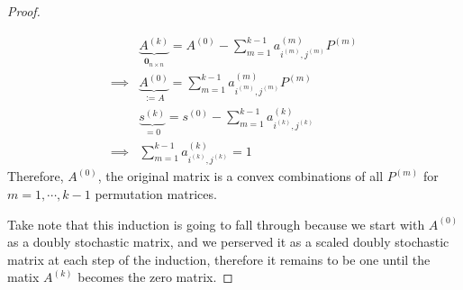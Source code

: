 \documentclass[]{article}
\theoremstyle{definition}
\begin{document}
\begin{proof}
\begin{itemize}
                \begin{align}
                    & 
                    \underbrace{A^{(k)}}_{\mathbf 0_{n\times n}} = A^{(0)} - \sum_{m = 1}^{k - 1}
                    a^{(m)}_{i^{(m)}, j^{(m)}}P^{(m)}
                    \\
                    \implies 
                    & 
                    \underbrace{A^{(0)}}_{:=A} = 
                    \sum_{m = 1}^{k - 1}
                    a^{(m)}_{i^{(m)}, j^{(m)}}P^{(m)}
                    \\
                    & \underbrace{s^{(k)}}_{=0} = s^{(0)} - \sum_{m = 1}^{k - 1}
                    a^{(k)}_{i^{(k)}, j^{(k)}}
                    \\
                    \implies &
                    \sum_{m = 1}^{k - 1}
                    a^{(k)}_{i^{(k)}, j^{(k)}} = 1
                \end{align}
                Therefore, $A^{(0)}$, the original matrix is a convex combinations of all $P^{(m)}$ for $m = 1, \cdots, k - 1$ permutation matrices. 
            \end{itemize}
            Take note that this induction is going to fall through because we start with $A^{(0)}$ as a doubly stochastic matrix, and we perserved it as a scaled doubly stochastic matrix at each step of the induction, therefore it remains to be one until the matix $A^{(k)}$ becomes the zero matrix. 
            
            
        \end{proof}
        
\end{document}
